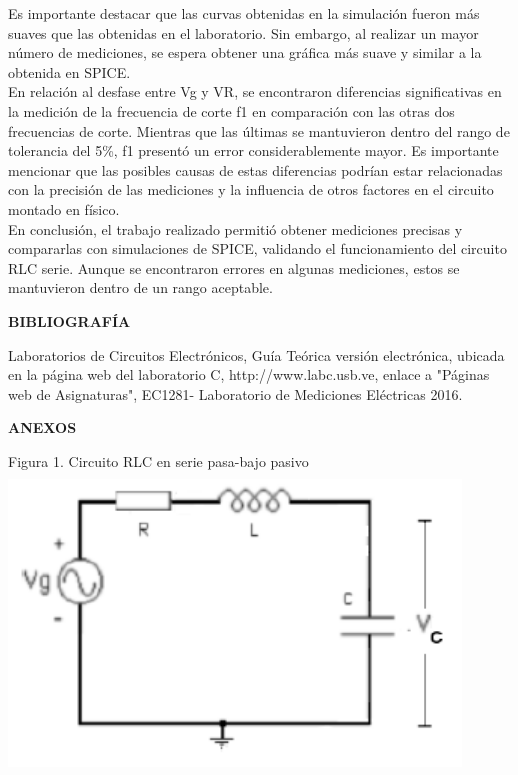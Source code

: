 \documentclass[12pt]{article}
\begin{document}
    Es importante destacar que las curvas obtenidas en la simulación fueron más suaves que las obtenidas en el laboratorio. Sin embargo, al realizar un mayor número de mediciones, se espera obtener una gráfica más suave y similar a la obtenida en SPICE.\\
    
    En relación al desfase entre Vg y VR, se encontraron diferencias significativas en la medición de la frecuencia de corte f1 en comparación con las otras dos frecuencias de corte. Mientras que las últimas se mantuvieron dentro del rango de tolerancia del 5\%, f1 presentó un error considerablemente mayor. Es importante mencionar que las posibles causas de estas diferencias podrían estar relacionadas con la precisión de las mediciones y la influencia de otros factores en el circuito montado en físico.\\
    
    En conclusión, el trabajo realizado permitió obtener mediciones precisas y compararlas con simulaciones de SPICE, validando el funcionamiento del circuito RLC serie. Aunque se encontraron errores en algunas mediciones, estos se mantuvieron dentro de un rango aceptable. \\
    
    \newpage
    
    \begin{center}
        \textbf{\large BIBLIOGRAFÍA}\\
    \end{center}
    
    \noindent Laboratorios de Circuitos Electrónicos, Guía Teórica versión electrónica, ubicada en la página web del laboratorio C, http://www.labc.usb.ve, enlace a "Páginas web de Asignaturas", EC1281- Laboratorio de Mediciones Eléctricas 2016.
    
    \newpage
    
    \begin{center}
        \textbf{\large ANEXOS}\\
    \end{center}
    \noindent Figura 1. Circuito RLC en serie pasa-bajo pasivo\\
    \includegraphics[width=12cm,height=8cm]{Img/pasa-baja}
    
\end{document}
